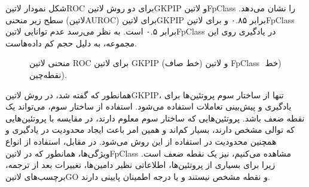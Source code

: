 شکل  نمودار ‌لاتین{ROC} برای دو روش ‌لاتین{GKPIP} و ‌لاتین{FpClass} را نشان می‌دهد. سطح زیر منحنی (‌لاتین{AUROC}) برای ‌لاتین{GKPIP} برابر ۰.۸۵ و برای ‌لاتین{FpClass} برابر ۰.۵ است. به نظر می‌رسد عدم توانایی ‌لاتین{FpClass} در یادگیری روی این مجموعه، به دلیل حجم کم داده‌هاست. 

\begin{figure}[ht]
\caption{
منحنی ‌لاتین
‫{‬ROC‫}‬
برای 
‌لاتین{
GKPIP
} (خط صاف) و ‌لاتین{
FpClass
‫}‬
‫(‬خط نقطه‌چین).
}
\label{fig:roc-curve}
\end{figure}

همانطور که گفته شد، در روش ‌لاتین{GKPIP}، تنها از ساختار سوم پروتئین‌ها برای یادگیری و پیش‌بینی تعاملات استفاده می‌شود. استفاده از ساختار سوم، می‌تواند یک نقطه ضعف باشد. پروتئین‌هایی که ساختار سوم معلوم دارند، در مقایسه با پروتئین‌هایی که توالی مشخص دارند، بسیار کم‌اند و همین امر باعث ایجاد محدودیت در یادگیری و همچنین محدودیت در استفاده از این روش می‌شود. در مقابل، استفاده از انواع ویژگی‌ها، همانطور که در ‌لاتین{FpClass} مشاهده می‌کنیم، نیز یک نقطه ضعف است. زیرا برای بسیاری از پروتئین‌ها، اطلاعاتی نظیر دامین‌ها، تغییرات بعد از ترجمه، برچسب‌های ‌لاتین{GO} و ‌نقطه مشخص نیستند و یا درجه اطمینان پایینی دارند.

